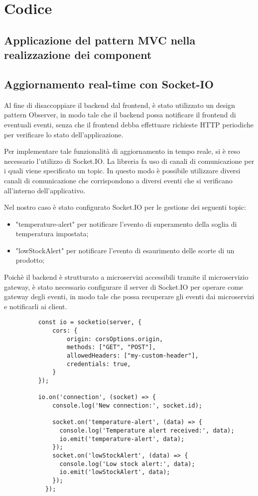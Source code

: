 \section{Codice}
\subsection{Applicazione del pattern MVC nella realizzazione dei component}


\subsection{Aggiornamento real-time con Socket-IO}
Al fine di disaccoppiare il backend dal frontend, è stato utilizzato un design pattern Observer, in modo tale che il backend possa notificare il frontend di eventuali eventi, senza che il frontend debba effettuare richieste HTTP periodiche per verificare lo stato dell'applicazione.

Per implementare tale funzionalità di aggiornamento in tempo reale, si è reso necessario l'utilizzo di Socket.IO. 
La libreria fa uso di canali di comunicazione per i quali viene specificato un topic. 
In questo modo è possibile utilizzare diversi canali di comunicazione che corrispondono a diversi eventi che si verificano all'interno dell'applicativo. 

Nel nostro caso è stato configurato Socket.IO per le gestione dei seguenti topic:
\begin{itemize}
  \item "temperature-alert" per notificare l'evento di superamento della soglia di temperatura impostata;
  \item "lowStockAlert" per notificare l'evento di esaurimento delle scorte di un prodotto;
\end{itemize}

Poichè il backend è strutturato a microservizi accessibili tramite il microservizio gateway, è stato necessario configurare il server di Socket.IO per operare come gateway degli eventi, in modo tale che possa recuperare gli eventi dai microservizi e notificarli ai client.

\begin{figure}[H]
\centering
\begin{verbatim}
    const io = socketio(server, {
        cors: {
            origin: corsOptions.origin,
            methods: ["GET", "POST"],
            allowedHeaders: ["my-custom-header"],
            credentials: true,
        }
    });

    io.on('connection', (socket) => {
        console.log('New connection:', socket.id);
      
        socket.on('temperature-alert', (data) => {
          console.log('Temperature alert received:', data);
          io.emit('temperature-alert', data);
        });
        socket.on('lowStockAlert', (data) => {
          console.log('Low stock alert:', data);
          io.emit('lowStockAlert', data);
        });
      });
\end{verbatim}
\end{figure}

